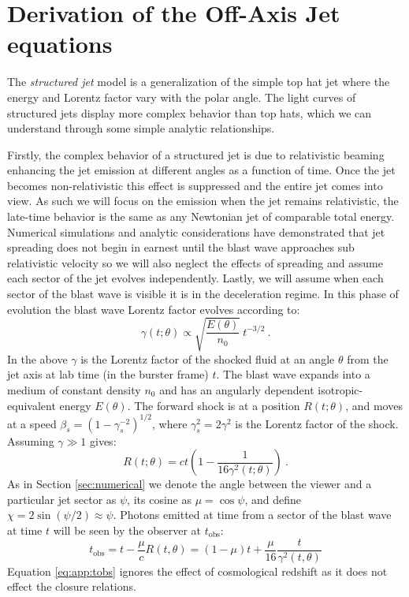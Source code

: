 \documentclass[twocolumn]{aastex62}
\newcommand{\tobs}{\ensuremath{t_{\mathrm{obs}}}}
\begin{document}


\appendix
\section{Derivation of the Off-Axis Jet equations}\label{app:derive1}

  The \emph{structured jet} model is a generalization of the simple top hat jet where the energy and Lorentz factor vary with the polar angle.  The light curves of structured jets display more complex behavior than top hats, which we can understand through some simple analytic relationships.
  
  Firstly, the complex behavior of a structured jet is due to relativistic beaming enhancing the jet emission at different angles as a function of time.  Once the jet becomes non-relativistic this effect is suppressed and the entire jet comes into view.  As such we will focus on the emission when the jet remains relativistic, the late-time behavior is the same as any Newtonian jet of comparable total energy.  Numerical simulations and analytic considerations have demonstrated that jet spreading does not begin in earnest until the blast wave approaches sub relativistic velocity so we will also neglect the effects of spreading and assume each sector of the jet evolves independently.  Lastly, we will assume when each sector of the blast wave is visible it is in the deceleration regime.  In this phase of evolution the blast wave Lorentz factor evolves according to:
  \begin{equation}
	\gamma(t; \theta) \propto \sqrt{\frac{E(\theta)}{n_0}}\ t^{-3/2}\ . \label{eq:app:lorentzEvolution}
\end{equation}
  In the above $\gamma$ is the Lorentz factor of the shocked fluid at an angle $\theta$ from the jet axis at lab time (in the burster frame) $t$.  The blast wave expands into a medium of constant density $n_0$ and has an angularly dependent isotropic-equivalent energy $E(\theta)$.  The forward shock is at a position $R(t; \theta)$, and moves at a speed $\beta_s = (1-\gamma_s^{-2})^{1/2}$, where $\gamma_s^2 = 2 \gamma^2$ is the Lorentz factor of the shock.  Assuming $\gamma \gg 1$ gives:
\begin{equation}
	R(t; \theta) = ct\left(1-\frac{1}{16 \gamma^2(t; \theta)}\right)\ .
\end{equation}
As in Section \ref{sec:numerical} we denote the angle between the viewer and a particular jet sector as $\psi$, its cosine as $\mu = \cos \psi$, and define $\chi = 2 \sin(\psi/2) \approx \psi$.  Photons emitted at time from a sector of the blast wave at time $t$ will be seen by the observer at $\tobs$:
\begin{equation}
	\tobs = t - \frac{\mu}{c} R(t,\theta) = (1-\mu)t + \frac{\mu}{16}\frac{t}{ \gamma^2(t,\theta)} \label{eq:app:tobs}
\end{equation}
Equation \eqref{eq:app:tobs} ignores the effect of cosmological redshift as it does not effect the closure relations.
\end{document}
